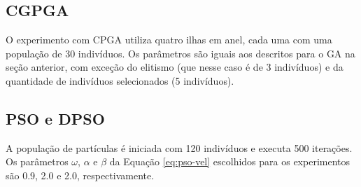 \subsection{CGPGA}

O experimento com CPGA utiliza quatro ilhas em anel, cada uma com uma população de 30 indivíduos. Os parâmetros são iguais aos descritos para o GA na seção anterior, com exceção do elitismo (que nesse caso é de 3 indivíduos) e da quantidade de indivíduos selecionados (5 indivíduos).

\subsection{PSO e DPSO}

A população de partículas é iniciada com 120 indivíduos e executa 500 iterações. Os parâmetros $\omega$, $\alpha$ e $\beta$ da Equação \ref{eq:pso-vel} escolhidos para os experimentos são 0.9, 2.0 e 2.0, respectivamente.